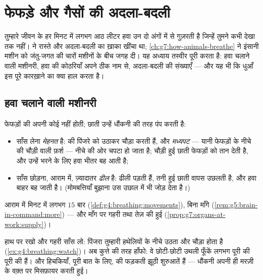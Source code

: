 \chapter{फेफड़े और गैसों की अदला-बदली}\label{ch:g7:lungs-and-gas-exchange}

तुम्हारे जीवन के हर मिनट में लगभग आठ लीटर हवा उन दो अंगों में से
गुज़रती है जिन्हें तुमने कभी देखा तक नहीं।  ने
रास्ते और अदला-बदली का ख़ाका खींचा था;
\cref{ch:g7:how-animals-breathe} ने इंसानी मशीन को जंतु-जगत की चारों
मशीनों के बीच जगह दी। यह अध्याय तस्वीर पूरी करता है: हवा चलाने वाली
मशीनरी, हवा की कोठरियाँ अपने ठीक नाम से, अदला-बदली की संख्याएँ --- और
यह भी कि धुआँ इस पूरे कारख़ाने का क्या हाल करता है।

\section{हवा चलाने वाली मशीनरी}

\begin{proposition}[हवा कैसे चलाई जाती है]\label{prop:g7:lungs-and-gas-exchange:ventilation}
फेफड़ों की अपनी कोई  नहीं होती; छाती उन्हें धौंकनी की तरह पंप करती
है:
\begin{itemize}
  \item साँस लेना \emph{मेहनत} है:  की  पिंजरे को उठाकर
        चौड़ा करती हैं, और \emph{मध्यपट} --- यानी
        फेफड़ों के नीचे की चौड़ी  वाली फ़र्श --- नीचे की ओर चपटा
        हो जाता है; चौड़ी हुई छाती फेफड़ों को तान देती है, और उन्हें
        भरने के लिए हवा भीतर बह आती है;
  \item साँस छोड़ना, आराम में, ज़्यादातर \emph{ढील} है:  ढीली
        पड़ती हैं, तनी हुई छाती वापस उछलती है, और हवा बाहर बह जाती है।
        (मोमबत्तियाँ बुझाना उस उछाल में  भी जोड़ देता है।)
\end{itemize}
आराम में मिनट में लगभग $15$ बार
(\cref{def:g4:breathing:movements}), बिना माँगे
(\cref{rem:g5:brain-in-command:more}) --- और माँग पर गहरी तथा तेज़ की
हुई (\cref{prop:g7:organs-at-work:supply})।
\end{proposition}
\admitted

\begin{example}\label{ex:g7:lungs-and-gas-exchange:feel}
हाथ  पर रखो और गहरी साँस लो: पिंजरा तुम्हारी हथेलियों के नीचे
उठता और चौड़ा होता है (\cref{ex:g4:breathing:watch})। अब कुत्ते की तरह
हाँफो: वे छोटी-छोटी उथली फूँकें लगभग पूरी की पूरी  की हैं। और
हिचकियाँ, पूरी बात के लिए,  की फड़कती झूठी शुरुआतें हैं ---
धौंकनी अपनी ही मरज़ी के वक़्त पर मिसफ़ायर करती हुई।
\end{example}

